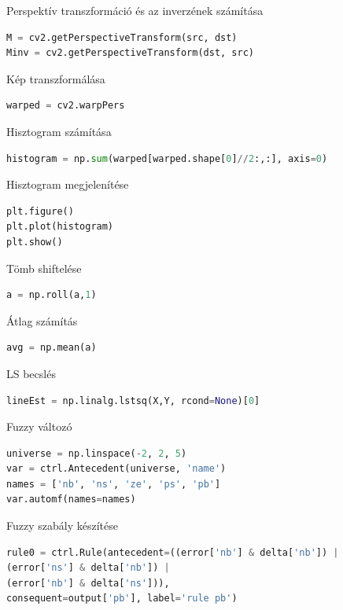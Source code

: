 \documentclass[12pt,a4paper,oneside]{report}             %
\begin{document}
Perspektív transzformáció és az inverzének számítása

\begin{lstlisting}[language=Python]
M = cv2.getPerspectiveTransform(src, dst)
Minv = cv2.getPerspectiveTransform(dst, src)
\end{lstlisting}

Kép transzformálása

\begin{lstlisting}[language=Python]
warped = cv2.warpPers
\end{lstlisting}

Hisztogram számítása

\begin{lstlisting}[language=Python]
histogram = np.sum(warped[warped.shape[0]//2:,:], axis=0)
\end{lstlisting}

Hisztogram megjelenítése

\begin{lstlisting}[language=Python]
plt.figure()
plt.plot(histogram)
plt.show()
\end{lstlisting}

Tömb shiftelése

\begin{lstlisting}[language=Python]
a = np.roll(a,1)
\end{lstlisting}

Átlag számítás

\begin{lstlisting}[language=Python]
avg = np.mean(a)
\end{lstlisting}

LS becslés

\begin{lstlisting}[language=Python]
lineEst = np.linalg.lstsq(X,Y, rcond=None)[0]
\end{lstlisting}

Fuzzy változó

\begin{lstlisting}[language=Python]
universe = np.linspace(-2, 2, 5)
var = ctrl.Antecedent(universe, 'name')
names = ['nb', 'ns', 'ze', 'ps', 'pb']
var.automf(names=names)
\end{lstlisting}

Fuzzy szabály készítése

\begin{lstlisting}[language=Python]
rule0 = ctrl.Rule(antecedent=((error['nb'] & delta['nb']) |
(error['ns'] & delta['nb']) |
(error['nb'] & delta['ns'])),
consequent=output['pb'], label='rule pb')
\end{lstlisting}
\end{document}
